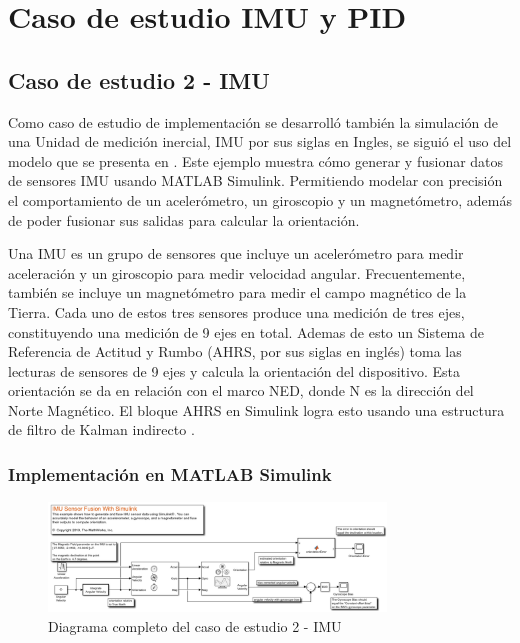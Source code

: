 \chapter{Caso de estudio IMU y PID}
\label{ch:especifico3}

\section{Caso de estudio 2 - IMU}

Como caso de estudio de implementación se desarrolló también la simulación de una Unidad de medición inercial, IMU por sus siglas en Ingles, se siguió el uso del modelo que se presenta en \cite{mathworks2024imu}. Este ejemplo muestra cómo generar y fusionar datos de sensores IMU usando MATLAB Simulink. Permitiendo modelar con precisión el comportamiento de un acelerómetro, un giroscopio y un magnetómetro, además de poder fusionar sus salidas para calcular la orientación.

Una IMU es un grupo de sensores que incluye un acelerómetro para medir aceleración y un giroscopio para medir velocidad angular. Frecuentemente, también se incluye un magnetómetro para medir el campo magnético de la Tierra. Cada uno de estos tres sensores produce una medición de tres ejes, constituyendo una medición de 9 ejes en total. Ademas de esto un Sistema de Referencia de Actitud y Rumbo (AHRS, por sus siglas en inglés) toma las lecturas de sensores de 9 ejes y calcula la orientación del dispositivo. Esta orientación se da en relación con el marco NED, donde N es la dirección del Norte Magnético. El bloque AHRS en Simulink logra esto usando una estructura de filtro de Kalman indirecto \cite{mathworks2024imu}.

\subsection{Implementación en MATLAB Simulink}

\begin{figure}[h!]
    \centering
    \includegraphics[width=0.8\textwidth]{fig/Capitulo5/Caso_de_estudio_IMU/FULL_IMU.pdf}
    \caption{Diagrama completo del caso de estudio 2 - IMU \cite{mathworks2024imu}}
    \label{fig:caso_de_estudio_2_IMU}
\end{figure}


